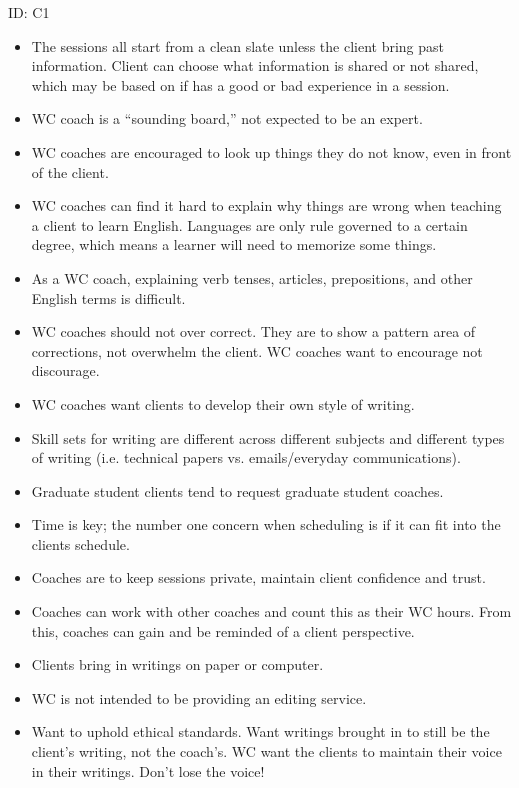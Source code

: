 \documentclass[12pt]{article} %
\begin{document}
  ID: C1
  \begin{itemize}
    \item The sessions all start from a clean slate unless the client bring past information.  Client can choose what information is shared or not shared, which may be based on if has a good or bad experience in a session.
    \item WC coach is a “sounding board,” not expected to be an expert.
    \item WC coaches are encouraged to look up things they do not know, even in front of the client.
    \item WC coaches can find it hard to explain why things are wrong when teaching a client to learn English.  Languages are only rule governed to a certain degree, which means a learner will need to memorize some things.
    \item As a WC coach, explaining verb tenses, articles, prepositions, and other English terms is difficult.
    \item WC coaches should not over correct.  They are to show a pattern area of corrections, not overwhelm the client.  WC coaches want to encourage not discourage.
    \item WC coaches want clients to develop their own style of writing.
    \item Skill sets for writing are different across different subjects and different types of writing (i.e. technical papers vs. emails/everyday communications).
    \item Graduate student clients tend to request graduate student coaches.
    \item Time is key; the number one concern when scheduling is if it can fit into the clients schedule.
    \item Coaches are to keep sessions private, maintain client confidence and trust.
    \item Coaches can work with other coaches and count this as their WC hours.  From this, coaches can gain and be reminded of a client perspective.
    \item Clients bring in writings on paper or computer.
    \item WC is not intended to be providing an editing service.
    \item Want to uphold ethical standards.  Want writings brought in to still be the client’s writing, not the coach’s.  WC want the clients to maintain their voice in their writings.  Don’t lose the voice!
  \end{itemize}
  
\end{document}
